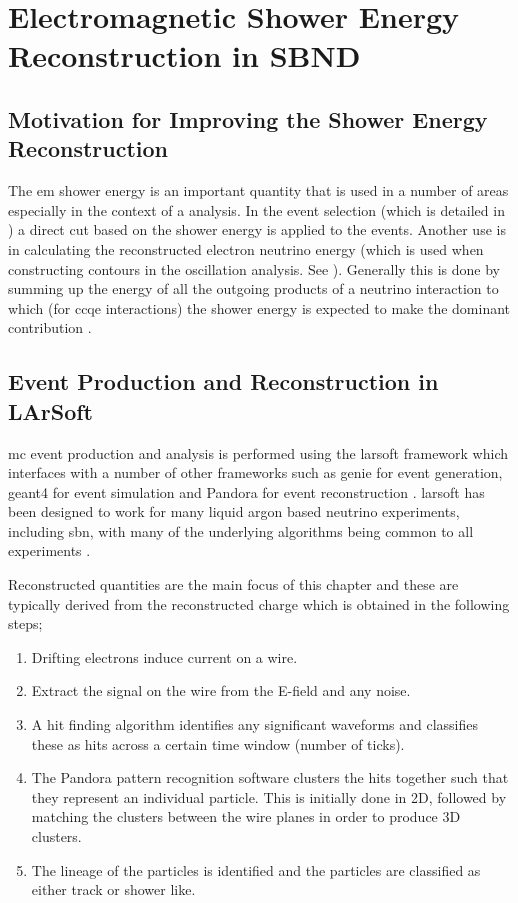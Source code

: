 \chapter{Electromagnetic Shower Energy Reconstruction in SBND}
\label{chap:Energy_Reco}
\section{Motivation for Improving the Shower Energy Reconstruction}

The \gls{em} shower energy is an important quantity that is used in a number of areas especially in the context of a \nue analysis. In the \nue event selection (which is detailed in ) a direct cut based on the shower energy is applied to the events. Another use is in calculating the reconstructed electron neutrino energy (which is used when constructing contours in the oscillation analysis. See ). Generally this is done by summing up the energy of all the outgoing products of a neutrino interaction to which (for \nue \gls{ccqe} interactions) the shower energy is expected to make the dominant contribution \cite{neutrino_energy_reconstruction}.

\section{Event Production and Reconstruction in LArSoft}\label{sec:Event Production and Reconstruction in LArSoft}

\gls{mc} event production and analysis is performed using the \gls{larsoft} framework which interfaces with a number of other frameworks such as \gls{genie} for event generation, \gls{geant4} for event simulation and Pandora for event reconstruction \cite{GENIE}\cite{Geant4_website}\cite{Geant4_paper}\cite{Pandora_paper}. \gls{larsoft} has been designed to work for many liquid argon based neutrino experiments, including \gls{sbn}, with many of the underlying algorithms being common to all experiments \cite{larsoft}\cite{larsoft_paper}.

Reconstructed quantities are the main focus of this chapter and these are typically derived from the reconstructed charge which is obtained in the following steps;
\begin{enumerate}
    \item Drifting electrons induce current on a wire.
    \item Extract the signal on the wire from the E-field and any noise. 
    \item A hit finding algorithm identifies any significant waveforms and classifies these as hits across a certain time window (number of ticks). 
    \item The Pandora pattern recognition software clusters the hits together such that they represent an individual particle. This is initially done in 2D, followed by matching the clusters between the wire planes in order to produce 3D clusters.
    \item The lineage of the particles is identified and the particles are classified as either track or shower like.
\end{enumerate}

